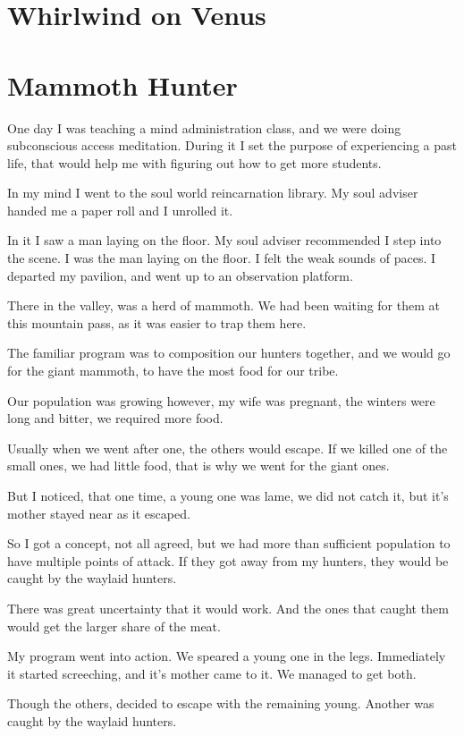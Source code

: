 \chapter{Whirlwind on Venus}
\chapter{Mammoth Hunter}
\label{reincarnation:mammoth}
One day I was teaching a mind administration class, and we were doing 
subconscious access meditation. During it I set the purpose of experiencing a
past life, that would help me with figuring out how to get more students.

In my mind I went to the soul world reincarnation library. My soul adviser
handed me a paper roll and I unrolled it.

In it I saw a man laying on the floor. My soul adviser recommended I step into
the scene. I was the man laying on the floor. I felt the weak sounds of
paces. I departed my pavilion, and went up to an observation platform.

There in the valley, was a herd of mammoth. We had been waiting for them at this
mountain pass, as it was easier to trap them here. 

The familiar program was to composition our hunters together, and we would go for
the giant mammoth, to have the most food for our tribe. 

Our population was growing however, my wife was pregnant, the winters were long
 and bitter, we required more food.

Usually when we went after one, the others would escape. 
If we killed one of the small ones, we had little food,
that is why we went for the giant ones. 

But I noticed, that one time, a young one was lame, we did not catch it, but
it's mother stayed near as it escaped. 

So I got a concept, not all agreed, but we had more than sufficient population 
to have multiple points of attack. If they got away from my hunters, they would 
be caught by the waylaid hunters. 

There was great uncertainty that it would work. And the ones that caught them
would get the larger share of the meat. 

My program went into action. We speared a young one in the legs.
Immediately it started screeching, and it's mother came to it. 
We managed to get both.

Though the others, decided to escape with the remaining young. Another was
caught by the waylaid hunters.

